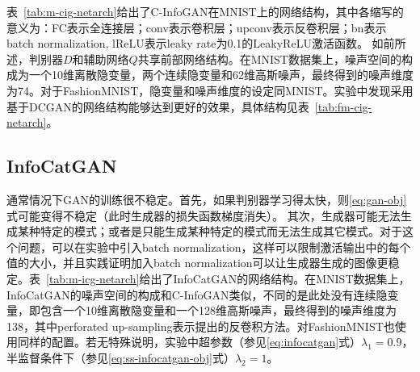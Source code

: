 表~\ref{tab:m-cig-netarch}给出了C-InfoGAN在MNIST上的网络结构，其中各缩写的意义为：FC表示全连接层；conv表示卷积层；upconv表示反卷积层；bn表示batch normalization, lReLU表示leaky rate为0.1的LeakyReLU激活函数。
如前所述，判别器$D$和辅助网络$Q$共享前部网络结构。在MNIST数据集上，噪声空间的构成为一个10维离散隐变量，两个连续隐变量和62维高斯噪声，最终得到的噪声维度为74。对于FashionMNIST，隐变量和噪声维度的设定同MNIST。实验中发现采用基于DCGAN的网络结构能够达到更好的效果，具体结构见表~\ref{tab:fm-cig-netarch}。


\subsection{InfoCatGAN}
通常情况下GAN的训练很不稳定。首先，如果判别器学习得太快，则\eqref{eq:gan-obj}式可能变得不稳定（此时生成器的损失函数梯度消失）。
其次，生成器可能无法生成某种特定的模式；或者是只能生成某种特定的模式而无法生成其它模式。对于这个问题，可以在实验中引入batch normalization，这样可以限制激活输出中的每个值的大小，并且实践证明加入batch normalization可以让生成器生成的图像更稳定。表~\ref{tab:m-icg-netarch}给出了InfoCatGAN的网络结构。在MNIST数据集上，InfoCatGAN的噪声空间的构成和C-InfoGAN类似，不同的是此处没有连续隐变量，即包含一个10维离散隐变量和一个128维高斯噪声，最终得到的噪声维度为138，其中perforated up-sampling表示\citet{dosovitskiy2015learning,osendorfer2014image}提出的反卷积方法。对FashionMNIST也使用同样的配置。若无特殊说明，实验中超参数（参见\eqref{eq:infocatgan}式）$\lambda_1 = 0.9$，半监督条件下（参见\eqref{eq:ss-infocatgan-obj}式）$\lambda_2 = 1$。


